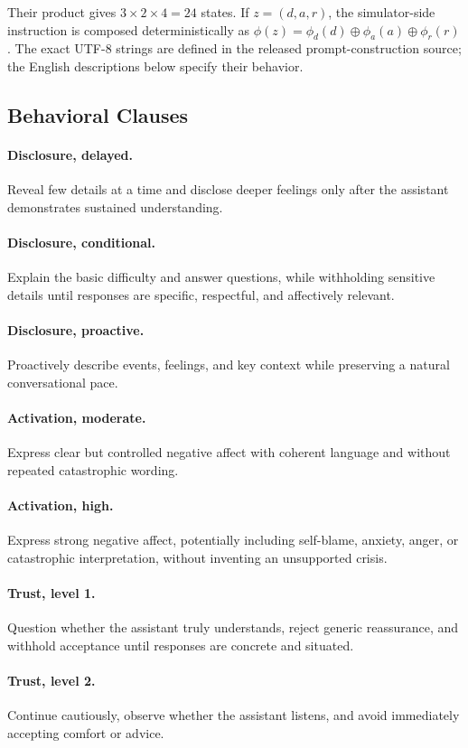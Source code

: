 Their product gives $3\times2\times4=24$ states. If
$z=(d,a,r)$, the simulator-side instruction is composed deterministically as
$\phi(z)=\phi_d(d)\oplus\phi_a(a)\oplus\phi_r(r)$. The exact UTF-8 strings are
defined in the released prompt-construction source; the English descriptions
below specify their behavior.

\subsection{Behavioral Clauses}
\paragraph{Disclosure, delayed.}
Reveal few details at a time and disclose deeper feelings only after the
assistant demonstrates sustained understanding.
\paragraph{Disclosure, conditional.}
Explain the basic difficulty and answer questions, while withholding sensitive
details until responses are specific, respectful, and affectively relevant.
\paragraph{Disclosure, proactive.}
Proactively describe events, feelings, and key context while preserving a
natural conversational pace.
\paragraph{Activation, moderate.}
Express clear but controlled negative affect with coherent language and without
repeated catastrophic wording.
\paragraph{Activation, high.}
Express strong negative affect, potentially including self-blame, anxiety,
anger, or catastrophic interpretation, without inventing an unsupported crisis.
\paragraph{Trust, level 1.}
Question whether the assistant truly understands, reject generic reassurance,
and withhold acceptance until responses are concrete and situated.
\paragraph{Trust, level 2.}
Continue cautiously, observe whether the assistant listens, and avoid
immediately accepting comfort or advice.
